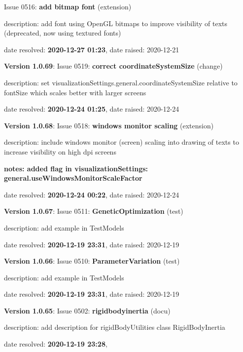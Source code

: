   Issue 0516: {\bf add bitmap font}
(extension)
  \bi
  \item {\small description: add font using OpenGL bitmaps to improve visibility of texts (deprecated, now using textured fonts)}
  \item   date resolved: {\bf 2020-12-27 01:23},
date raised: 2020-12-21   \ei
  \item {\bf Version 1.0.69}: \vspace{-6pt} 
  Issue 0519: {\bf correct coordinateSystemSize}
(change)
  \bi
  \item {\small description: set visualizationSettings.general.coordinateSystemSize relative to fontSize which scales better with larger screens}
  \item   date resolved: {\bf 2020-12-24 01:25},
date raised: 2020-12-24   \ei
  \item {\bf Version 1.0.68}: \vspace{-6pt} 
  Issue 0518: {\bf windows monitor scaling}
(extension)
  \bi
  \item {\small description: include windows monitor (screen) scaling into drawing of texts to increase visibility on high dpi screens}
  \item {\small \bf notes: added flag in visualizationSettings: general.useWindowsMonitorScaleFactor}
  \item   date resolved: {\bf 2020-12-24 00:22},
date raised: 2020-12-24   \ei
  \item {\bf Version 1.0.67}: \vspace{-6pt} 
  Issue 0511: {\bf GeneticOptimization}
(test)
  \bi
  \item {\small description: add example in TestModels}
  \item   date resolved: {\bf 2020-12-19 23:31},
date raised: 2020-12-19   \ei
  \item {\bf Version 1.0.66}: \vspace{-6pt} 
  Issue 0510: {\bf ParameterVariation}
(test)
  \bi
  \item {\small description: add example in TestModels}
  \item   date resolved: {\bf 2020-12-19 23:31},
date raised: 2020-12-19   \ei
  \item {\bf Version 1.0.65}: \vspace{-6pt} 
  Issue 0502: {\bf rigidbodyinertia}
(docu)
  \bi
  \item {\small description: add description for rigidBodyUtilities class RigidBodyInertia}
  \item   date resolved: {\bf 2020-12-19 23:28},
